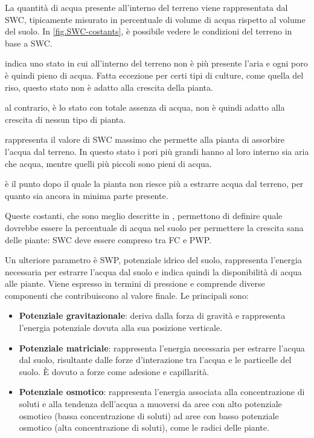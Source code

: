 \documentclass[12pt,a4paper,openright,twoside, openany]{book}
\begin{document}
La quantità di acqua presente all'interno del terreno viene rappresentata dal \ac{SWC}, tipicamente misurato in percentuale di volume di acqua rispetto al volume del suolo.
In \cref{fig.SWC-costants}, è possibile vedere le condizioni del terreno in base a \ac{SWC}.
\begin{description}[noitemsep]
    \item[Saturation] indica uno stato in cui all'interno del terreno non è più presente l'aria e ogni poro è quindi pieno di acqua. Fatta eccezione per certi tipi di culture, come quella del riso, questo stato non è adatto alla crescita della pianta.
    \item[Oven dry] al contrario, è lo stato con totale assenza di acqua, non è quindi adatto alla crescita di nessun tipo di pianta.
    \item[\ac{FC}] rappresenta il valore di \ac{SWC} massimo che permette alla pianta di assorbire l'acqua dal terreno. In questo stato i pori più grandi hanno al loro interno sia aria che acqua, mentre quelli più piccoli sono pieni di acqua.
    \item[\ac{PWP}] è il punto dopo il quale la pianta non riesce più a estrarre acqua dal terreno, per quanto sia ancora in minima parte presente.
\end{description}
\newpage
Queste costanti, che sono meglio descritte in \cite{RAI2017505}, permettono di definire quale dovrebbe essere la percentuale di acqua nel suolo per permettere la crescita sana delle piante: \ac{SWC} deve essere compreso tra \ac{FC} e \ac{PWP}.

Un ulteriore parametro è \ac{SWP}, potenziale idrico del suolo, rappresenta l'energia necessaria per estrarre l'acqua dal suolo e indica quindi la disponibilità di acqua alle piante. Viene espresso in termini di pressione e comprende diverse componenti che contribuiscono al valore finale\cite{MarshallT.J.TheoJohn1996Sp}. Le principali sono:

\begin{itemize}[noitemsep]
    \item \textbf{Potenziale gravitazionale}: deriva dalla forza di gravità e rappresenta l'energia potenziale dovuta alla sua posizione verticale.
    \item \textbf{Potenziale matriciale}: rappresenta l'energia necessaria per estrarre l'acqua dal suolo, risultante dalle forze d'interazione tra l'acqua e le particelle del suolo. È dovuto a forze come adesione e capillarità.
    \item \textbf{Potenziale osmotico}: rappresenta l'energia associata alla concentrazione di soluti e alla tendenza dell'acqua a muoversi da aree con alto potenziale osmotico (bassa concentrazione di soluti) ad aree con basso potenziale osmotico (alta concentrazione di soluti), come le radici delle piante.
\end{itemize}
\end{document}
